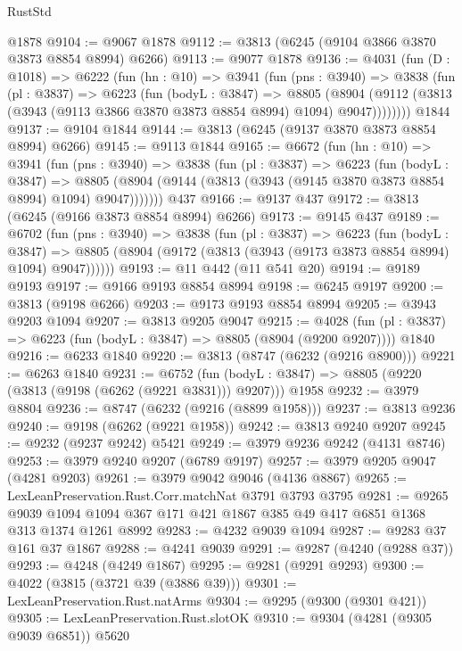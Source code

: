 \begin{lexlean}{RustStd}
\begin{coremodule}
{\begin{coremodule}
{{{{{{{{{{{{{{{{{{{{{{{{{{{{{{{{{{{    @1878
@9104 := @9067 @1878
@9112 := @3813 (@6245 (@9104 @3866 @3870 @3873 @8854 @8994) @6266)
@9113 := @9077 @1878
@9136 := @4031
    (fun (D : @1018) =>
    @6222
      (fun (hn : @10) =>
      @3941
        (fun (pns : @3940) =>
        @3838
          (fun (pl : @3837) =>
          @6223
            (fun (bodyL : @3847) =>
            @8805
              (@8904 (@9112 (@3813 (@3943 (@9113 @3866 @3870 @3873 @8854 @8994) @1094) @9047))))))))
    @1844
@9137 := @9104 @1844
@9144 := @3813 (@6245 (@9137 @3870 @3873 @8854 @8994) @6266)
@9145 := @9113 @1844
@9165 := @6672
    (fun (hn : @10) =>
    @3941
      (fun (pns : @3940) =>
      @3838
        (fun (pl : @3837) =>
        @6223
          (fun (bodyL : @3847) =>
          @8805 (@8904 (@9144 (@3813 (@3943 (@9145 @3870 @3873 @8854 @8994) @1094) @9047)))))))
    @437
@9166 := @9137 @437
@9172 := @3813 (@6245 (@9166 @3873 @8854 @8994) @6266)
@9173 := @9145 @437
@9189 := @6702
    (fun (pns : @3940) =>
    @3838
      (fun (pl : @3837) =>
      @6223
        (fun (bodyL : @3847) =>
        @8805 (@8904 (@9172 (@3813 (@3943 (@9173 @3873 @8854 @8994) @1094) @9047))))))
@9193 := @11 @442 (@11 @541 @20)
@9194 := @9189 @9193
@9197 := @9166 @9193 @8854 @8994
@9198 := @6245 @9197
@9200 := @3813 (@9198 @6266)
@9203 := @9173 @9193 @8854 @8994
@9205 := @3943 @9203 @1094
@9207 := @3813 @9205 @9047
@9215 := @4028
    (fun (pl : @3837) => @6223 (fun (bodyL : @3847) => @8805 (@8904 (@9200 @9207))))
    @1840
@9216 := @6233 @1840
@9220 := @3813 (@8747 (@6232 (@9216 @8900)))
@9221 := @6263 @1840
@9231 := @6752
    (fun (bodyL : @3847) => @8805 (@9220 (@3813 (@9198 (@6262 (@9221 @3831))) @9207)))
    @1958
@9232 := @3979 @8804
@9236 := @8747 (@6232 (@9216 (@8899 @1958)))
@9237 := @3813 @9236
@9240 := @9198 (@6262 (@9221 @1958))
@9242 := @3813 @9240 @9207
@9245 := @9232 (@9237 @9242) @5421
@9249 := @3979 @9236 @9242 (@4131 @8746)
@9253 := @3979 @9240 @9207 (@6789 @9197)
@9257 := @3979 @9205 @9047 (@4281 @9203)
@9261 := @3979 @9042 @9046 (@4136 @8867)
@9265 := LexLeanPreservation.Rust.Corr.matchNat @3791 @3793 @3795
@9281 := @9265
    @9039
    @1094
    @1094
    @367
    @171
    @421
    @1867
    @385
    @49
    @417
    @6851
    @1368
    @313
    @1374
    @1261
    @8992
@9283 := @4232 @9039 @1094
@9287 := @9283 @37 @161 @37 @1867
@9288 := @4241 @9039
@9291 := @9287 (@4240 (@9288 @37))
@9293 := @4248 (@4249 @1867)
@9295 := @9281 (@9291 @9293)
@9300 := @4022 (@3815 (@3721 @39 (@3886 @39)))
@9301 := LexLeanPreservation.Rust.natArms
@9304 := @9295 (@9300 (@9301 @421))
@9305 := LexLeanPreservation.Rust.slotOK
@9310 := @9304 (@4281 (@9305 @9039 @6851)) @5620
}}}}}}}}}}}}}}}}}}}}}}}}}}}}}}}}}}}
\end{coremodule}}
\end{coremodule}
\end{lexlean}
